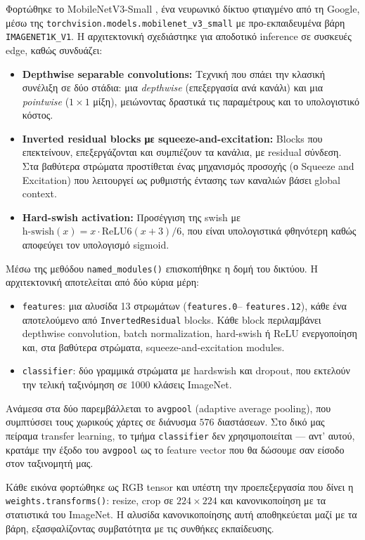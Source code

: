 \documentclass[12pt, a4paper]{article}
\begin{document}
Φορτώθηκε το MobileNetV3-Small \cite{howard2019}, ένα νευρωνικό δίκτυο φτιαγμένο από τη Google, μέσω της \texttt{torchvision.models.mobilenet\_v3\_small}
με προ-εκπαιδευμένα βάρη \texttt{IMAGENET1K\_V1}. Η αρχιτεκτονική σχεδιάστηκε για
αποδοτικό inference σε συσκευές edge, καθώς συνδυάζει:
\begin{itemize}
    \item \textbf{Depthwise separable convolutions:} Τεχνική που σπάει την κλασική συνέλιξη σε δύο στάδια: μια \textit{depthwise} (επεξεργασία ανά κανάλι) και μια \textit{pointwise} ($1 \times 1$ μίξη), μειώνοντας δραστικά τις παραμέτρους και το υπολογιστικό κόστος.
    \item \textbf{Inverted residual blocks με squeeze-and-excitation:} Blocks που επεκτείνουν, επεξεργάζονται και συμπιέζουν τα κανάλια, με residual σύνδεση. Στα βαθύτερα στρώματα προστίθεται ένας μηχανισμός προσοχής (ο Squeeze and Excitation) που λειτουργεί ως ρυθμιστής έντασης των καναλιών βάσει global context.
    \item \textbf{Hard-swish activation:} Προσέγγιση της swish με $\text{h-swish}(x) = x \cdot \text{ReLU6}(x+3)/6$, που είναι υπολογιστικά φθηνότερη καθώς αποφεύγει τον υπολογισμό sigmoid.
\end{itemize}

Μέσω της μεθόδου \texttt{named\_modules()} επισκοπήθηκε η δομή του δικτύου. Η
αρχιτεκτονική αποτελείται από δύο κύρια μέρη:
\begin{itemize}
    \item \texttt{features}: μια αλυσίδα 13 στρωμάτων (\texttt{features.0}–%
    \texttt{features.12}), κάθε ένα αποτελούμενο από \texttt{InvertedResidual}
    blocks. Κάθε block περιλαμβάνει depthwise convolution, batch normalization,
    hard-swish ή ReLU ενεργοποίηση και, στα βαθύτερα στρώματα,
    squeeze-and-excitation modules.
    \item \texttt{classifier}: δύο γραμμικά στρώματα με hardswish και dropout,
    που εκτελούν την τελική ταξινόμηση σε 1000 κλάσεις ImageNet.
\end{itemize}
Ανάμεσα στα δύο παρεμβάλλεται το \texttt{avgpool} (adaptive average pooling),
που συμπτύσσει τους χωρικούς χάρτες σε διάνυσμα $576$ διαστάσεων. Στο δικό μας
πείραμα transfer learning, το τμήμα \texttt{classifier} δεν χρησιμοποιείται — αντ' αυτού,
κρατάμε την έξοδο του \texttt{avgpool} ως το feature vector που θα δώσουμε σαν είσοδο στον ταξινομητή μας.

Κάθε εικόνα φορτώθηκε ως RGB tensor και υπέστη την προεπεξεργασία
που δίνει η \texttt{weights.transforms()}: resize, crop σε $224 \times 224$
και κανονικοποίηση με τα στατιστικά του ImageNet. Η αλυσίδα κανονικοποίησης αυτή αποθηκεύεται
μαζί με τα βάρη, εξασφαλίζοντας συμβατότητα με τις συνθήκες εκπαίδευσης.
\end{document}

